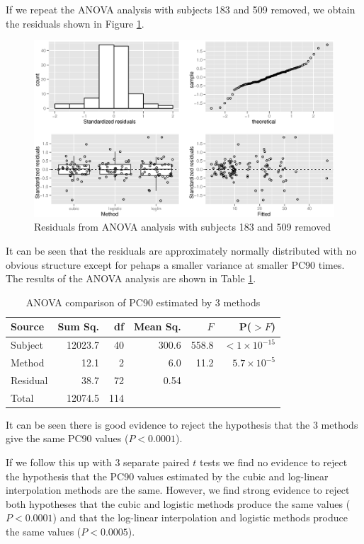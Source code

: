 If we repeat the ANOVA analysis with subjects 183 and 509 removed, we obtain the residuals shown in Figure \ref{pc90resid-sub}.
\begin{figure}[h]
\includegraphics[width=6.5in]{pc90resid-sub.eps} 
\caption{Residuals from ANOVA analysis with subjects 183 and 509 removed}
\label{pc90resid-sub}
\end{figure}
It can be seen that the residuals are approximately normally distributed with no obvious structure except for pehaps a smaller variance at smaller PC90 times. The results of the ANOVA analysis are shown in Table \ref{pc90aov}.
\begin{table}[h]
\centering
\caption{ANOVA comparison of PC90 estimated by 3 methods}\label{pc90aov}
\begin{tabular}{l|rrrrr}
Source&Sum Sq.&df&Mean Sq.&$F$&P($>F$)\\
\hline
Subject&12023.7&40&300.6&558.8&$<1\times 10^{-15}$\\
Method&12.1&2&6.0&11.2&$5.7\times 10^{-5}$\\
Residual&38.7&72&0.54&&\\
\hline
Total&12074.5&114&&&
\end{tabular}
\end{table}
It can be seen there is good evidence to reject the hypothesis that the 3 methods give the same PC90 values ($P<0.0001$).

If we follow this up with 3 separate paired $t$ tests we find no evidence to reject the hypothesis that the PC90 values estimated by the cubic and log-linear interpolation methods are the same. However, we find strong evidence to reject both hypotheses that the cubic and logistic methods produce the same values ($P<0.0001$) and that the log-linear interpolation and logistic methods produce the same values ($P<0.0005$).  
